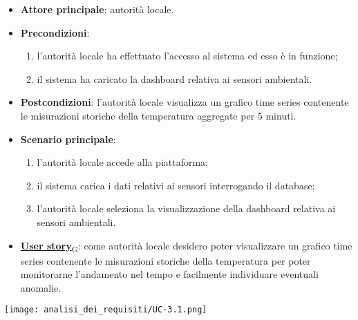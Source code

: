 \begin{itemize}
	\item \textbf{Attore principale}: autorità locale.
	\item \textbf{Precondizioni}:
	      \begin{enumerate}
		      \item l'autorità locale ha effettuato l'accesso al sistema ed esso è in funzione;
		      \item il sistema ha caricato la dashboard relativa ai sensori ambientali.
	      \end{enumerate}
	\item \textbf{Postcondizioni}: l'autorità locale visualizza un grafico time series contenente le misurazioni storiche
	      della temperatura aggregate per 5 minuti.
	\item \textbf{Scenario principale}:
	      \begin{enumerate}
		      \item l'autorità locale accede alla piattaforma;
		      \item il sistema carica i dati relativi ai sensori interrogando il database;
		      \item l'autorità locale seleziona la visualizzazione della dashboard relativa ai sensori ambientali.
	      \end{enumerate}
	\item \href{https://7last.github.io/docs/rtb/documentazione-interna/glossario\#user-story}{\textbf{User story}\textsubscript{G}}: come autorità locale desidero poter visualizzare un grafico time series contenente le misurazioni storiche della temperatura
	      per poter monitorarne l'andamento nel tempo e facilmente individuare eventuali anomalie.
\end{itemize}
\begin{center}
	\texttt{[image: analisi\_dei\_requisiti/UC-3.1.png]}
\end{center}


